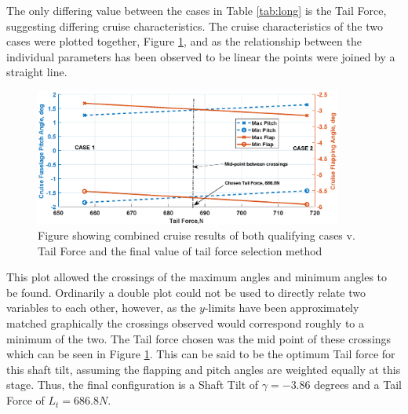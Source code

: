 \documentclass[11pt,a4paper]{article}
\begin{document}
The only differing value between the cases in Table \ref{tab:long} is the Tail Force, suggesting differing cruise characteristics. The cruise characteristics of the two cases were plotted together, Figure \ref{fig:cases}, and as the relationship between the individual parameters has been observed to be linear the points were joined by a straight line.
\begin{figure}[H]
    \centering
    \includegraphics[width=0.9\textwidth]{cases.eps}
    \caption{Figure showing combined cruise results of both qualifying cases v. Tail Force and the final value of tail force selection method}
    \label{fig:cases}
\end{figure}{}
This plot allowed the crossings of the maximum angles and minimum angles to be found. Ordinarily a double plot could not be used to directly relate two variables to each other, however, as the $y$-limits have been approximately matched graphically the crossings observed would correspond roughly to a minimum of the two. The Tail force chosen was the mid point of these crossings which can be seen in Figure \ref{fig:cases}. This can be said to be the optimum Tail force for this shaft tilt, assuming the flapping and pitch angles are weighted equally at this stage. Thus, the final configuration is a Shaft Tilt of $\gamma=-3.86$ degrees and a Tail Force of $L_t=686.8N$.
\end{document}
